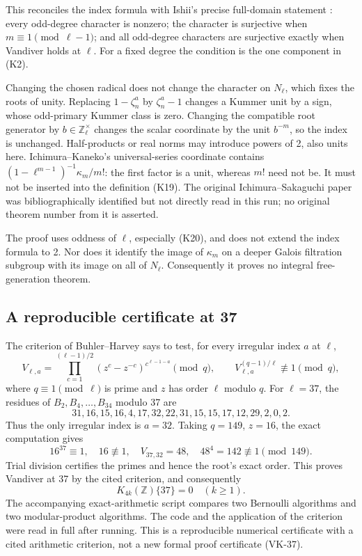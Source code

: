 \documentclass[11pt,a4paper]{article}
\theoremstyle{definition}
\begin{document}
This reconciles the index formula with Ishii's precise
full-domain statement \cite[Theorem~1.1, p.~2]{IshiiKummer2024}:
every odd-degree character is nonzero; the character is
surjective when \(m\equiv1\pmod{\ell-1}\); and all odd-degree
characters are surjective exactly when Vandiver holds at
\(\ell\). For a fixed degree the condition is the one
component in (K2).

Changing the chosen radical does not change the character
on \(N_\ell\), which fixes the roots of unity.
Replacing \(1-\zeta_n^a\) by \(\zeta_n^a-1\) changes a
Kummer unit by a sign, whose odd-primary Kummer class is
zero. Changing the compatible root generator by
\(b\in\mathbb Z_\ell^\times\) changes the scalar coordinate
by the unit \(b^{-m}\), so the index is unchanged.
Half-products or real norms may introduce powers of 2,
also units here. Ichimura--Kaneko's universal-series
coordinate \cite[\S1.1, pp.~313--314]{IchimuraKaneko1989}
contains \((1-\ell^{m-1})^{-1}\kappa_m/m!\):
the first factor is a unit, whereas \(m!\) need not be.
It must not be inserted into the definition (K19).
The original Ichimura--Sakaguchi paper was bibliographically
identified but not directly read in this run; no original
theorem number from it is asserted.

The proof uses oddness of \(\ell\), especially (K20), and
does not extend the index formula to 2. Nor does it
identify the image of \(\kappa_m\) on a deeper Galois
filtration subgroup with its image on all of \(N_\ell\).
Consequently it proves no integral free-generation theorem.

\subsection{A reproducible certificate at 37}

The criterion of Buhler--Harvey
\cite[\S4, author preprint pp.~4--5]{BuhlerHarvey2011}
says to test, for every irregular index \(a\) at \(\ell\),
\[
 V_{\ell,a}=
 \prod_{c=1}^{(\ell-1)/2}
   (z^c-z^{-c})^{c^{\ell-1-a}}\pmod q,\qquad
 V_{\ell,a}^{(q-1)/\ell}\not\equiv1\pmod q,           \tag{K21}
\]
where \(q\equiv1\pmod\ell\) is prime and \(z\) has order
\(\ell\) modulo \(q\).
For \(\ell=37\), the residues of
\(B_2,B_4,\ldots,B_{34}\) modulo 37 are
\[
31,16,15,16,4,17,32,22,31,15,15,17,12,29,2,0,2.
\]
Thus the only irregular index is \(a=32\).
Taking \(q=149\), \(z=16\), the exact computation gives
\[
 16^{37}\equiv1,\quad16\not\equiv1,\quad
 V_{37,32}=48,\quad48^4=142\not\equiv1\pmod{149}.
\]
Trial division certifies the primes and hence the root's
exact order. This proves Vandiver at 37 by the cited
criterion, and consequently
\[
 K_{4k}(\mathbb Z)\{37\}=0\quad(k\ge1).
\]
The accompanying exact-arithmetic script compares two
Bernoulli algorithms and two modular-product algorithms.
The code and the application of the criterion were read
in full after running. This is a reproducible numerical
certificate with a cited arithmetic criterion, not a new
formal proof certificate (VK-37).
\end{document}
